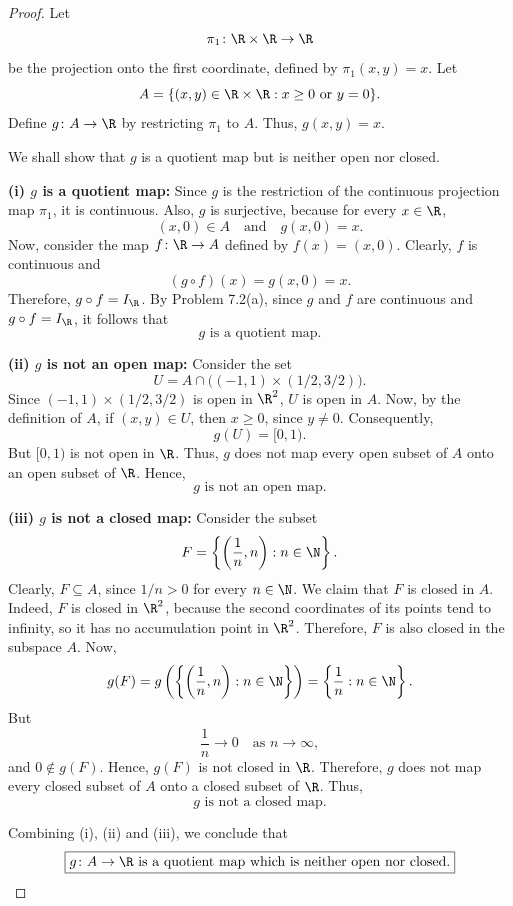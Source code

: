 
\begin{proof}
Let
\[ \pi_1\colon\R\times\R\to\R \]
be the projection onto the first coordinate, defined by $\pi_1(x,y)=x$. Let
\[ A=\{(x,y)\in\R\times\R : x\ge0\text{ or }y=0\}. \]
Define $g\colon A\to\R$ by restricting $\pi_1$ to $A$. Thus, $g(x,y)=x$.

We shall show that $g$ is a quotient map but is neither open nor closed.

\medskip
\textbf{(i) $g$ is a quotient map:}
Since $g$ is the restriction of the continuous projection map $\pi_1$, it is continuous. Also,
$g$ is surjective, because for every $x\in\R$,
\[ (x,0)\in A\quad\text{and}\quad g(x,0)=x. \]
Now, consider the map $f\colon\R\to A$ defined by $f(x)=(x,0)$. Clearly, $f$ is continuous and
\[ (g\circ f)(x)=g(x,0)=x. \]
Therefore, $g\circ f=I_\R$. By Problem 7.2(a), since $g$ and $f$ are continuous and
$g\circ f=I_\R$, it follows that
\[ \boxed{g\text{ is a quotient map.}} \]

\medskip
\textbf{(ii) $g$ is not an open map:}
Consider the set
\[ U=A\cap\bigl((-1,1)\times(1/2,3/2)\bigr). \]
Since $(-1,1)\times(1/2,3/2)$ is open in $\R^2$, $U$ is open in $A$. Now, by the definition of
$A$, if $(x,y)\in U$, then $x\ge0$, since $y\neq0$. Consequently,
\[ g(U)=[0,1). \]
But $[0,1)$ is not open in $\R$. Thus, $g$ does not map every open subset of $A$ onto an open
subset of $\R$. Hence,
\[ \boxed{g\text{ is not an open map.}} \]

\medskip
\textbf{(iii) $g$ is not a closed map:}
Consider the subset
\[ F=\left\{\left(\frac1n,n\right) : n\in\N\right\}. \]
Clearly, $F\subseteq A$, since $1/n>0$ for every $n\in\N$. We claim that $F$ is closed in $A$.
Indeed, $F$ is closed in $\R^2$, because the second coordinates of its points tend to infinity,
so it has no accumulation point in $\R^2$. Therefore, $F$ is also closed in the subspace $A$.
Now,
\[ g(F)=g\left(\left\{\left(\frac1n,n\right) : n\in\N\right\}\right)
       =\left\{\frac1n : n\in\N\right\}. \]
But
\[ \frac1n\longrightarrow0\quad\text{as }n\longrightarrow\infty, \]
and $0\notin g(F)$. Hence, $g(F)$ is not closed in $\R$. Therefore, $g$ does not map every
closed subset of $A$ onto a closed subset of $\R$. Thus,
\[ \boxed{g\text{ is not a closed map.}} \]

Combining (i), (ii) and (iii), we conclude that
\[ \boxed{g\colon A\to\R\text{ is a quotient map which is neither open nor closed.}} \qedhere \]
\end{proof}
